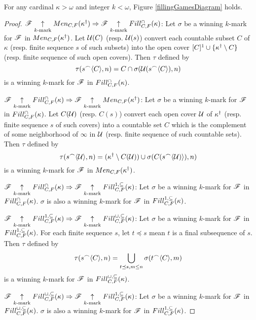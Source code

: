 \begin{thm}
For any cardinal $\kappa>\omega$ and integer $k<\omega$,
Figure \ref{fillingGamesDiagram} holds.
\end{thm}

\begin{proof}
  $\mathscr{F} \underset{k\text{-mark}}{\uparrow}Men_{C,F}(\kappa^\dagger)
    \Rightarrow
  \mathscr{F} \underset{k\text{-mark}}{\uparrow}Fill^{\cap}_{C,F}(\kappa)$:
  Let $\sigma$ be a winning $k$-mark for $\mathscr{F}$ in
  $Men_{C,F}(\kappa^\dagger)$. Let $\mathcal{U}(C)$ (resp. $\mathcal{U}(s)$) convert each
  countable subset $C$ of $\kappa$ (resp. finite sequence $s$ of such subsets)
  into the open cover $[C]^1\cup\{\kappa^\dagger\setminus C\}$
  (resp. finite sequence of such open covers). Then $\tau$ defined by
    \[
      \tau(s{^\frown}\langle C\rangle,n)
        =
      C\cap\sigma(\mathcal{U}(s{^\frown}\langle C\rangle),n)
    \]
  is a winning $k$-mark for $\mathscr{F}$ in $Fill^{\cap}_{C,F}(\kappa)$.

  $\mathscr{F} \underset{k\text{-mark}}{\uparrow}Fill^{\cap}_{C,F}(\kappa)
    \Rightarrow
  \mathscr{F} \underset{k\text{-mark}}{\uparrow}Men_{C,F}(\kappa^\dagger)$:
  Let $\sigma$ be a winning $k$-mark for $\mathscr{F}$ in
  $Fill^{\cap}_{C,F}(\kappa)$. Let $C(\mathcal{U})$ (resp. $C(s)$) convert each open
  cover $\mathcal{U}$ of $\kappa^\dagger$ (resp. finite sequence $s$ of such covers)
  into a countable set $C$ which is the complement of some neighborhood of
  $\infty$ in $\mathcal{U}$ (resp. finite sequence of such countable sets).
  Then $\tau$ defined by
    \[
      \tau(s{^\frown}\langle\mathcal{U}\rangle,n)
        =
      (\kappa^\dagger\setminus C(\mathcal{U}))
        \cup
      \sigma(C(s{^\frown}\langle\mathcal{U})\rangle),n)
    \]
  is a winning $k$-mark for $\mathscr{F}$ in $Men_{C,F}(\kappa^\dagger)$.

  $\mathscr{F} \underset{k\text{-mark}}{\uparrow}Fill^{\cap}_{C,F}(\kappa)
    \Rightarrow
  \mathscr{F} \underset{k\text{-mark}}{\uparrow}Fill^{1,\subseteq}_{C,F}(\kappa)$:
  Let $\sigma$ be a winning $k$-mark for $\mathscr{F}$ in
  $Fill^{\cap}_{C,F}(\kappa)$. $\sigma$ is also a winning $k$-mark for $\mathscr{F}$
  in $Fill^{1,\subseteq}_{C,F}(\kappa)$.

  $\mathscr{F} \underset{k\text{-mark}}{\uparrow}Fill^{1,\subseteq}_{C,F}(\kappa)
    \Rightarrow
  \mathscr{F} \underset{k\text{-mark}}{\uparrow}Fill^{\cup,\subseteq}_{C,F}(\kappa)$: Let $\sigma$ be a winning $k$-mark for $\mathscr{F}$ in
  $Fill^{1,\subseteq}_{C,F}(\kappa)$. For each finite sequence $s$, let $t\preceq s$ mean $t$
  is a final subsequence of $s$. Then $\tau$ defined by
    \[
      \tau(s{^\frown}\langle C\rangle,n)
        =
      \bigcup_{t\preceq s, m\leq n}
      \sigma(t{^\frown}\langle C\rangle,m)
    \]
  is a winning $k$-mark for $\mathscr{F}$ in $Fill^{\cup,\subseteq}_{C,F}(\kappa)$.

  $\mathscr{F} \underset{k\text{-mark}}{\uparrow}Fill^{\cup,\subseteq}_{C,F}(\kappa)
    \Rightarrow
  \mathscr{F} \underset{k\text{-mark}}{\uparrow}Fill^{1,\subseteq}_{C,F}(\kappa)$:
  Let $\sigma$ be a winning $k$-mark for $\mathscr{F}$ in
  $Fill^{\cup,\subseteq}_{C,F}(\kappa)$. $\sigma$ is also a winning $k$-mark for $\mathscr{F}$
  in $Fill^{1,\subseteq}_{C,F}(\kappa)$.


\end{proof}
